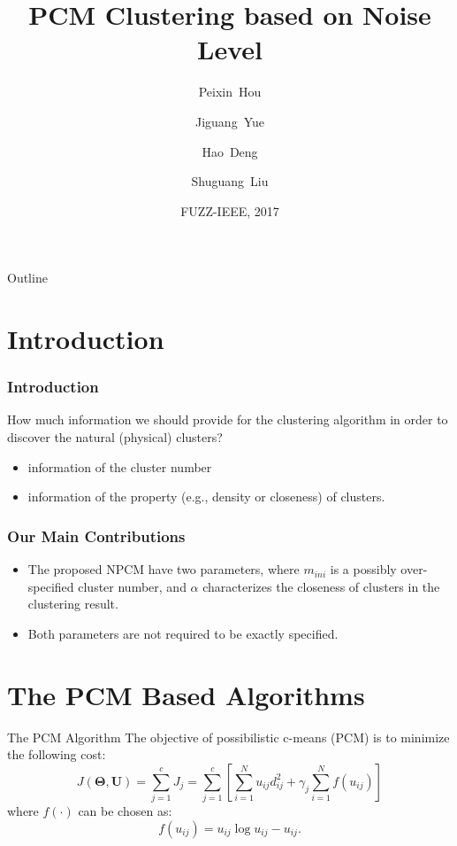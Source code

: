 \documentclass{beamer}
\title{PCM Clustering based on Noise Level}
\author{Peixin~Hou\inst{1} \and Jiguang~Yue\inst{1} \and Hao~Deng\inst{2} \and Shuguang~Liu\inst{3}}
\institute[Universities] %
{
  \inst{1}%
  Department of Control Science and Engineering, Tongji University
  \and
  \inst{2}%
  School of Physics and Electronics, Henan University
  \and
  \inst{3}%
  Department of Hydraulic Engineering, Tongji University
  }
\date{FUZZ-IEEE, 2017}
\begin{document}
\begin{frame}
  \titlepage
\end{frame}

\begin{frame}{Outline}
  \tableofcontents
\end{frame}


\section{Introduction}

\begin{frame}
  \frametitle{Introduction}
  How much information we should provide for the clustering algorithm
  in order to discover the natural (physical) clusters?
  \begin{itemize}
  \item information of the cluster number \pause
  \item information of the property (e.g., density or closeness) of
    clusters.
  \end{itemize}
\end{frame}

\begin{frame}
  \frametitle{Our Main Contributions}
  \begin{itemize}
  \item The proposed NPCM have two parameters, where $m_{ini}$ is a
    possibly over-specified cluster number, and $\alpha$ characterizes
    the closeness of clusters in the clustering result.
  \item Both parameters are not required to be exactly specified.
  \end{itemize}
  
\end{frame}


\section{The PCM Based Algorithms}


\begin{frame}{The PCM Algorithm}
  The objective of possibilistic c-means (PCM)
  \cite{krishnapuram_possibilistic_1993} is to minimize the following
  cost:
  \begin{equation}
    J(\mathbf{\Theta},\mathbf{U})=\sum_{j=1}^{c}J_j=\sum_{j=1}^{c}\left[\sum_{i=1}^{N}u_{ij}d_{ij}^2+\gamma_j \sum_{i=1}^{N}f(u_{ij})\right]
  \end{equation}
  where $f(\cdot)$ can be chosen as:
  \begin{equation}
    f(u_{ij})=u_{ij}\log u_{ij}-u_{ij}.
  \end{equation}
\end{frame}
\end{document}

